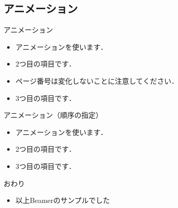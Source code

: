 \subsection{アニメーション}

\begin{frame}{アニメーション}
  \begin{itemize}
    \item アニメーションを使います．
    \pause
    \item 2つ目の項目です．
    \item ページ番号は変化しないことに注意してください．
    \pause
    \item 3つ目の項目です．
  \end{itemize}
\end{frame}

\begin{frame}{アニメーション（順序の指定）}
  \begin{itemize}
    \item<1-> アニメーションを使います．
    \item<3-> 2つ目の項目です．
    \item<2-> 3つ目の項目です．
  \end{itemize}
\end{frame}

\begin{frame}{おわり}
  \begin{itemize}
    \item 以上Beamerのサンプルでした
  \end{itemize}
\end{frame}
